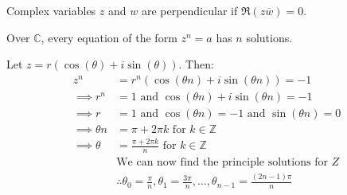 \begin{corollary}
    Complex variables $z$ and $w$ are perpendicular if $\Re(z\overline{w}) = 0$.
\end{corollary}

\begin{remark}
    Over $\mathbb{C}$, every equation of the form $z^n = a$ has $n$ solutions.
\end{remark}
\begin{example}
    [Solving $z^n = -1$]
    Let $z = r(\cos(\theta) + i\sin(\theta))$. Then:
    \begin{align*}
        z^n               & = r^n(\cos(\theta n) + i\sin(\theta n)) = -1                                                               \\
        \implies r^n      & = 1 \text{ and } \cos(\theta n) + i\sin(\theta n) = -1                                                     \\
        \implies r        & = 1 \text{ and } \cos(\theta n) = -1 \text{ and } \sin(\theta n) = 0                                       \\
        \implies \theta n & = \pi + 2\pi k \text{ for } k \in \mathbb{Z}                                                               \\
        \implies \theta   & = \frac{\pi + 2\pi k}{n} \text{ for } k \in \mathbb{Z}                                                     \\
                          & \text{We can now find the principle solutions for } Z                                                      \\
                          & \therefore \theta_0 = \frac{\pi}{n}, \theta_1 = \frac{3\pi}{n}, \ldots, \theta_{n-1} = \frac{(2n-1)\pi}{n}
    \end{align*}
\end{example}
